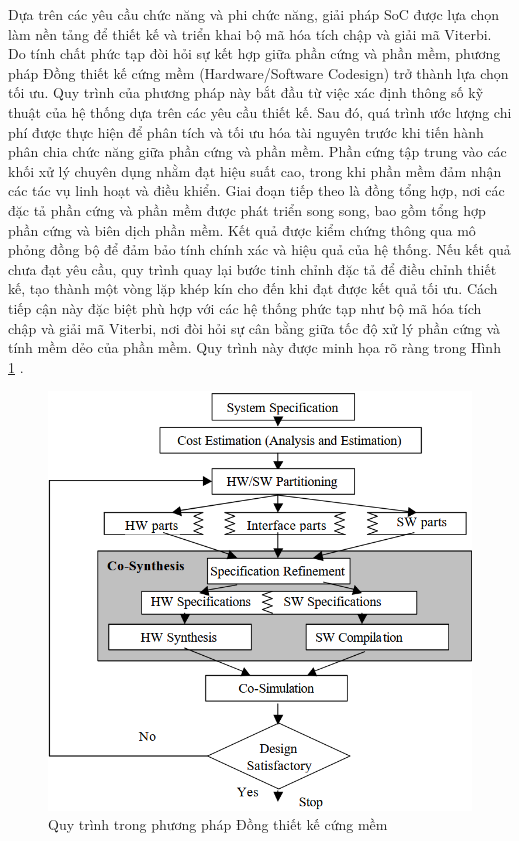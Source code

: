 \documentclass[../DoAn.tex]{subfiles}
\begin{document}
Dựa trên các yêu cầu chức năng và phi chức năng, giải pháp SoC được lựa chọn làm nền tảng để thiết kế và triển khai bộ mã hóa tích chập và giải mã Viterbi. Do tính chất phức tạp đòi hỏi sự kết hợp giữa phần cứng và phần mềm, phương pháp Đồng thiết kế cứng mềm (Hardware/Software Codesign) trở thành lựa chọn tối ưu. Quy trình của phương pháp này bắt đầu từ việc xác định thông số kỹ thuật của hệ thống dựa trên các yêu cầu thiết kế. Sau đó, quá trình ước lượng chi phí được thực hiện để phân tích và tối ưu hóa tài nguyên trước khi tiến hành phân chia chức năng giữa phần cứng và phần mềm. Phần cứng tập trung vào các khối xử lý chuyên dụng nhằm đạt hiệu suất cao, trong khi phần mềm đảm nhận các tác vụ linh hoạt và điều khiển. Giai đoạn tiếp theo là đồng tổng hợp, nơi các đặc tả phần cứng và phần mềm được phát triển song song, bao gồm tổng hợp phần cứng và biên dịch phần mềm. Kết quả được kiểm chứng thông qua mô phỏng đồng bộ để đảm bảo tính chính xác và hiệu quả của hệ thống. Nếu kết quả chưa đạt yêu cầu, quy trình quay lại bước tinh chỉnh đặc tả để điều chỉnh thiết kế, tạo thành một vòng lặp khép kín cho đến khi đạt được kết quả tối ưu. Cách tiếp cận này đặc biệt phù hợp với các hệ thống phức tạp như bộ mã hóa tích chập và giải mã Viterbi, nơi đòi hỏi sự cân bằng giữa tốc độ xử lý phần cứng và tính mềm dẻo của phần mềm. Quy trình này được minh họa rõ ràng trong Hình \ref{fig:Phương pháp đồng thiết kế cứng mềm} \cite{gallery_hardwaresoftware_2003}.

\begin{figure}[H]
    \centering
    \includegraphics[width=\textwidth, height=0.33\textheight, keepaspectratio]{Hinhve/methodology.png}
    \caption{Quy trình trong phương pháp Đồng thiết kế cứng mềm}
    \label{fig:Phương pháp đồng thiết kế cứng mềm}
\end{figure}
\end{document}
